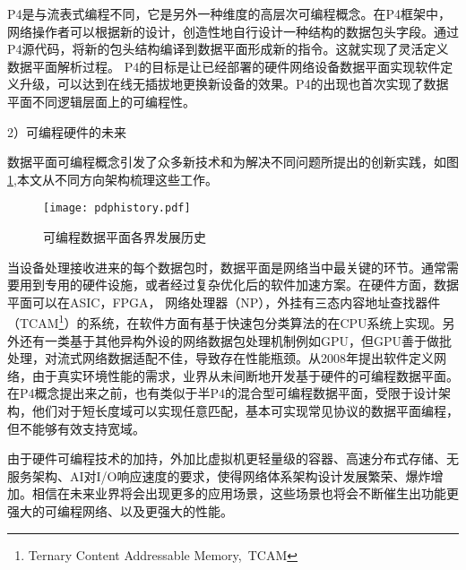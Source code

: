 P4是与流表式编程不同，它是另外一种维度的高层次可编程概念。在P4框架中，网络操作者可以根据新的设计，创造性地自行设计一种结构的数据包头字段。通过P4源代码，将新的包头结构编译到数据平面形成新的指令。这就实现了灵活定义数据平面解析过程。
P4的目标是让已经部署的硬件网络设备数据平面实现软件定义升级，可以达到在线无插拔地更换新设备的效果。P4的出现也首次实现了数据平面不同逻辑层面上的可编程性。

2）可编程硬件的未来

数据平面可编程概念引发了众多新技术和为解决不同问题所提出的创新实践，如图\ref{fig:pdphistory},本文从不同方向架构梳理这些工作。

\begin{figure}[!ht]
	\centering
	\texttt{[image: pdphistory.pdf]}
	\caption{可编程数据平面各界发展历史} \label{fig:pdphistory}
\end{figure}

当设备处理接收进来的每个数据包时，数据平面是网络当中最关键的环节。通常需要用到专用的硬件设施，或者经过复杂优化后的软件加速方案。在硬件方面，数据平面可以在ASIC，FPGA， 网络处理器（NP），外挂有三态内容地址查找器件（TCAM\footnote{Ternary Content Addressable Memory,~TCAM}）的系统，在软件方面有基于快速包分类算法的在CPU系统上实现。另外还有一类基于其他异构外设的网络数据包处理机制例如GPU，但GPU善于做批处理，对流式网络数据适配不佳，导致存在性能瓶颈。从2008年提出软件定义网络，由于真实环境性能的需求，业界从未间断地开发基于硬件的可编程数据平面。在P4概念提出来之前，也有类似于半P4的混合型可编程数据平面，受限于设计架构，他们对于短长度域可以实现任意匹配，基本可实现常见协议的数据平面编程，但不能够有效支持宽域。

由于硬件可编程技术的加持，外加比虚拟机更轻量级的容器、高速分布式存储、无服务架构、AI对I/O响应速度的要求，使得网络体系架构设计发展繁荣、爆炸增加。相信在未来业界将会出现更多的应用场景，这些场景也将会不断催生出功能更强大的可编程网络、以及更强大的性能。




\label{chap23}



